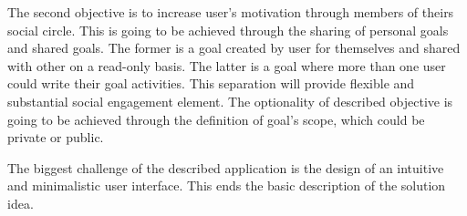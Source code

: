 The second objective is to increase user's motivation through members of theirs social circle.
This is going to be achieved through the sharing of personal goals and shared goals.
The former is a goal created by user for themselves and shared with other on a read-only basis.
The latter is a goal where more than one user could write their goal activities.
This separation will provide flexible and substantial social engagement element.
The optionality of described objective is going to be achieved through the definition of goal's scope, which could be private or public.

The biggest challenge of the described application is the design of an intuitive and minimalistic user interface.
This ends the basic description of the solution idea.
